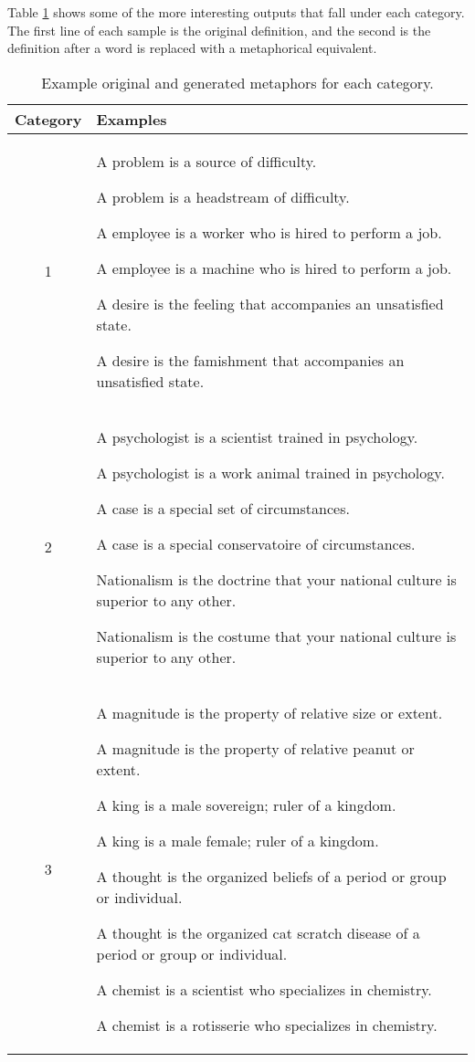 \documentclass[12pt]{article}
\begin{document}
Table \ref{tab:results} shows some of the more interesting outputs that fall under each category. The first line of each sample is the original definition, and the second is the definition after a word is replaced with a metaphorical equivalent.

\begin{table}[H]
	\centering
	\small
	\begin{tabular}{|c|p{12cm}|} \hline
		\textbf{Category} & \textbf{Examples}\\ \hline
		1 & 
		A problem is a source of difficulty.\par
        A problem is a headstream of difficulty.\par
        \medskip
        A employee is a worker who is hired to perform a job.\par
        A employee is a machine who is hired to perform a job.\par
        \medskip
        A desire is the feeling that accompanies an unsatisfied state.\par
        A desire is the famishment that accompanies an unsatisfied state.\par
        \\ \hline
        2 & 
        A psychologist is a scientist trained in psychology.\par
        A psychologist is a work animal trained in psychology.\par
        \medskip
        A case is a special set of circumstances.\par
        A case is a special conservatoire of circumstances.\par
        \medskip
        Nationalism is the doctrine that your national culture is superior to any other.\par
        Nationalism is the costume that your national culture is superior to any other.\par
        \\ \hline
		3 & 
		A magnitude is the property of relative size or extent.\par
        A magnitude is the property of relative peanut or extent.\par
        \medskip
        A king is a male sovereign; ruler of a kingdom.\par
        A king is a male female; ruler of a kingdom.\par
        \medskip
        A thought is the organized beliefs of a period or group or individual.\par
        A thought is the organized cat scratch disease of a period or group or individual.\par
        \medskip
        A chemist is a scientist who specializes in chemistry.\par
        A chemist is a rotisserie who specializes in chemistry.\par
		\\ \hline
	\end{tabular}
	\caption{Example original and generated metaphors for each category.}
	\label{tab:results}
\end{table}
\end{document}
